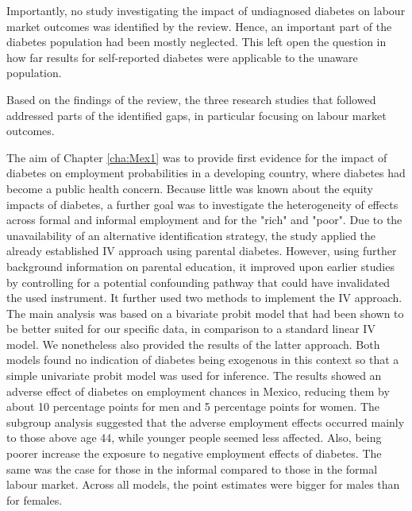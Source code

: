 Importantly, no study investigating the impact of undiagnosed diabetes on labour market outcomes was identified by the review. Hence, an important part of the diabetes population had been mostly neglected. This left open the question in how far results for self-reported diabetes were applicable to the unaware population.

Based on the findings of the review, the three research studies that followed addressed parts of the identified gaps, in particular focusing on labour market outcomes. 

The aim of Chapter \ref{cha:Mex1} was to provide first evidence for the impact of diabetes on employment probabilities in a developing country, where diabetes had become a public health concern. Because little was known about the equity impacts of diabetes, a further goal was to investigate the heterogeneity of effects across formal and informal employment and for the "rich" and "poor". Due to the unavailability of an alternative identification strategy, the study applied the already established \ac{IV} approach using parental diabetes. However, using further background information on parental education, it improved upon earlier studies by controlling for a potential confounding pathway that could have invalidated the used instrument. It further used two methods to implement the \ac{IV} approach. The main analysis was based on a bivariate probit model that had been shown to be better suited for our specific data, in comparison to a standard linear \ac{IV} model. We nonetheless also provided the results of the latter approach. Both models found no indication of diabetes being exogenous in this context so that a simple univariate probit model was used for inference. The results showed an adverse effect of diabetes on employment chances in Mexico, reducing them by about 10 percentage points for men and 5 percentage points for women. The subgroup analysis suggested that the adverse employment effects occurred mainly to those above age 44, while younger people seemed less affected. Also, being poorer increase the exposure to negative employment effects of diabetes. The same was the case for those in the informal compared to those in the formal labour market. Across all models, the point estimates were bigger for males than for females. 

